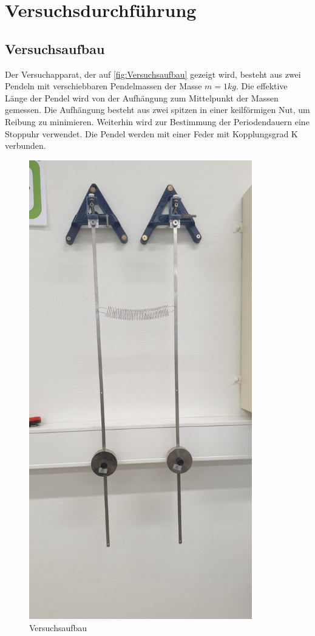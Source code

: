 

\section{Versuchsdurchführung}
\label{sec:Durchführung}
\subsection{Versuchsaufbau}
Der Versuchapparat, der auf \autoref{fig:Versuchsaufbau} gezeigt wird, besteht aus zwei Pendeln mit verschiebbaren 
Pendelmassen der Masse $m=1kg$. Die effektive Länge der Pendel wird von der Aufhängung zum 
Mittelpunkt der Massen gemessen. Die Aufhängung besteht aus zwei spitzen in einer keilförmigen 
Nut, um Reibung zu minimieren. Weiterhin wird zur Bestimmung der Periodendauern eine Stoppuhr 
verwendet. Die Pendel werden mit einer Feder mit Kopplungsgrad K verbunden.
\begin{figure}
    \centering
    \includegraphics[width=9.71cm,height=20cm]{Bild.pdf}
    \caption{Versuchsaufbau}
    \label{fig:Versuchsaufbau}
  \end{figure}
